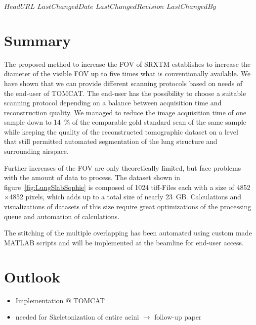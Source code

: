 \svnidlong
{$HeadURL$}
{$LastChangedDate$}
{$LastChangedRevision$}
{$LastChangedBy$}

\begin{center}
\end{center}

\section{Summary}
The proposed method to increase the FOV of SRXTM establishes to increase the diameter of the visible FOV up to five times what is conventionally available. We have shown that we can provide different scanning protocols based on needs of the end-user of TOMCAT. The end-user has the possibility to choose a suitable scanning protocol depending on a balance between acquisition time and reconstruction quality. We managed to reduce the image acquisition time of one sample down to \SI{14}{\percent} of the comparable gold standard scan of the same sample while keeping the quality of the reconstructed tomographic dataset on a level that still permitted automated segmentation of the lung structure and surrounding airspace.

Further increases of the FOV are only theoretically limited, but face problems with the amount of data to process. The dataset shown in figure~\ref{fig:LungSlabSophie} is composed of 1024 tiff-Files each with a size of 4852$\times$4852 pixels, which adds up to a total size of nearly \SI{23}{\giga B}. Calculations and visualizations of datasets of this size require great optimizations of the processing queue and automation of calculations.

The stitching of the multiple overlapping has been automated using custom made MATLAB scripts and will be implemented at the beamline for end-user access.

\section{Outlook}
\begin{itemize}
	\item Implementation @ TOMCAT
	\item needed for Skeletonization of entire acini $\rightarrow$ follow-up paper
\end{itemize}